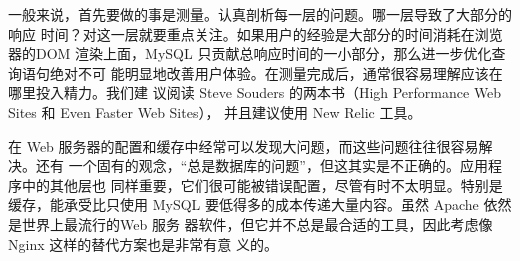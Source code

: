 一般来说，首先要做的事是测量。认真剖析每一层的问题。哪一层导致了大部分的响应
时间？对这一层就要重点关注。如果用户的经验是大部分的时间消耗在浏览器的DOM
渲染上面，MySQL 只贡献总响应时间的一小部分，那么进一步优化查询语句绝对不可
能明显地改善用户体验。在测量完成后，通常很容易理解应该在哪里投入精力。我们建
议阅读 Steve Souders 的两本书（High Performance Web Sites 和 Even Faster Web Sites），
并且建议使用 New Relic 工具。

在 Web 服务器的配置和缓存中经常可以发现大问题，而这些问题往往很容易解决。还有
一个固有的观念，“总是数据库的问题”，但这其实是不正确的。应用程序中的其他层也
同样重要，它们很可能被错误配置，尽管有时不太明显。特别是缓存，能承受比只使用
MySQL 要低得多的成本传递大量内容。虽然 Apache 依然是世界上最流行的Web 服务
器软件，但它并不总是最合适的工具，因此考虑像 Nginx 这样的替代方案也是非常有意
义的。


